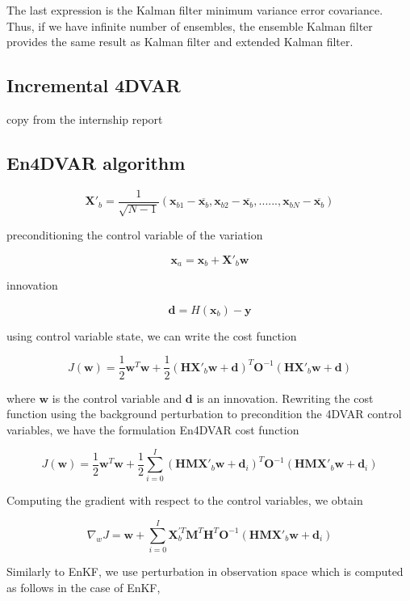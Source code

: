 \documentclass[a4,12pt]{article}
\numberwithin{equation}{section}
\begin{document}
The last expression is the Kalman filter minimum variance error covariance. Thus, if we have infinite number of ensembles, the ensemble Kalman filter provides the same result as Kalman filter and extended Kalman filter.

\subsection{Incremental 4DVAR}
copy from the internship report

\subsection{En4DVAR algorithm}

$$\textbf{X}'_{b}=\frac{1}{\sqrt{N-1}}(\textbf{x}_{b1}-\overline{\textbf{x}_{b}},\textbf{x}_{b2}-\overline{\textbf{x}_{b}},......,\textbf{x}_{bN}-\overline{\textbf{x}_{b}})$$

preconditioning the control variable of the variation

$$\textbf{x}_{a} = \textbf{x}_{b} + \textbf{X}'_{b}\textbf{w}$$

innovation

$$\textbf{d} = H(\textbf{x}_{b})-\textbf{y}$$

using control variable state, we can write the cost function

$$J(\textbf{w}) = \frac{1}{2} \textbf{w}^{T}\textbf{w} + \frac{1}{2}(\textbf{H}\textbf{X}'_{b}\textbf{w}+\textbf{d})^{T}\textbf{O}^{-1}(\textbf{H}\textbf{X}'_{b}\textbf{w}+\textbf{d})$$

where $\textbf{w}$ is the control variable and $\textbf{d}$ is an innovation. Rewriting the cost function using the background perturbation to precondition the 4DVAR control variables, we have the formulation En4DVAR cost function

$$J(\textbf{w}) = \frac{1}{2} \textbf{w}^{T}\textbf{w} + \frac{1}{2}\sum_{i=0}^{I}(\textbf{HM}\textbf{X}'_{b}\textbf{w} + \textbf{d}_{i})^{T}\textbf{O}^{-1}(\textbf{HMX}'_{b}\textbf{w}+\textbf{d}_{i})$$

Computing the gradient with respect to the control variables, we obtain

$$\nabla_{w}J = \textbf{w} + \sum_{i=0}^{I} \textbf{X}_{b}^{'T}\textbf{M}^{T}\textbf{H}^{T}\textbf{O}^{-1}(\textbf{HMX}'_{b}\textbf{w}+\textbf{d}_{i})$$

Similarly to EnKF, we use perturbation in observation space which is computed as follows in the case of EnKF,
\end{document}
